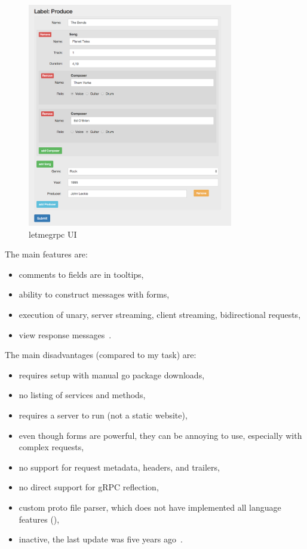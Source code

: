 \begin{figure}[hbt!]
    \centering
    \captionsetup{justification=centering}
    \includegraphics[width=0.8\textwidth]{images/grpc/letmegrpc}
    \caption{letmegrpc UI~\cite{grpc-letmegrpc}}
    \label{fig:grpc-letmegrpc}
\end{figure}

The main features are:
\begin{itemize}
    \item comments to fields are in tooltips,
    \item ability to construct messages with forms,
    \item execution of unary, server streaming, client streaming, bidirectional requests,
    \item view response messages~\cite{grpc-letmegrpc}.
\end{itemize}

The main disadvantages (compared to my task) are:
\begin{itemize}
    \item requires setup with manual go package downloads,
    \item no listing of services and methods,
    \item requires a server to run (not a static website),
    \item even though forms are powerful, they can be annoying to use, especially with complex requests,
    \item no support for request metadata, headers, and trailers,
    \item no direct support for gRPC reflection,
    \item custom proto file parser, which does not have implemented all language features (\cite{grpc-letmegrpc-issue44}),
    \item inactive, the last update was five years ago~\cite{grpc-letmegrpc}.
\end{itemize}

